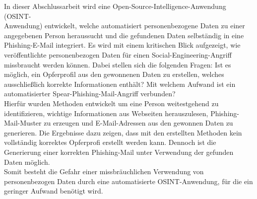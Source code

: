 \label{cha:kurzfassung} 
In dieser Abschlussarbeit wird eine Open-Source-Intelligence-Anwendung (OSINT-\\Anwendung) entwickelt, welche automatisiert personenbezogene Daten zu einer angegebenen Person heraussucht und die gefundenen Daten selbständig in eine Phishing-E-Mail integriert. Es wird mit einem kritischen Blick aufgezeigt, wie veröffentlichte personenbezogen Daten für einen Social-Engineering-Angriff missbraucht werden können. Dabei stellen sich die folgenden Fragen: Ist es möglich, ein Opferprofil aus den gewonnenen Daten zu erstellen, welches ausschließlich korrekte Informationen enthält? Mit welchem Aufwand ist ein automatisierter Spear-Phishing-Mail-Angriff verbunden?\\
Hierfür wurden Methoden entwickelt um eine Person weitestgehend zu identifizieren, wichtige Informationen aus Webseiten herauszulesen, Phishing-Mail-Muster zu erzeugen und E-Mail-Adressen aus den gewonnen Daten zu generieren. Die Ergebnisse dazu zeigen, dass mit den erstellten Methoden kein vollständig korrektes Opferprofi erstellt werden kann. Dennoch ist die Generierung einer korrekten Phishing-Mail unter Verwendung der gefunden Daten möglich.\\
Somit besteht die Gefahr einer missbräuchlichen Verwendung von personenbezogen Daten durch eine automatisierte OSINT-Anwendung, für die ein geringer Aufwand benötigt wird.



